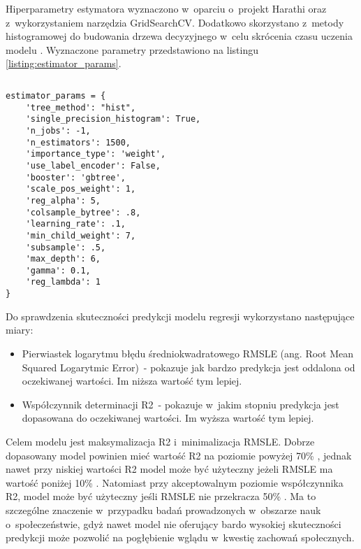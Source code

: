 Hiperparametry estymatora wyznaczono w~oparciu o~projekt Harathi \cite{harathi-2018} oraz z~wykorzystaniem narzędzia GridSearchCV.
Dodatkowo skorzystano z~metody histogramowej do budowania drzewa decyzyjnego w~celu skrócenia czasu uczenia modelu \cite{golarnyk-2021}.
Wyznaczone parametry przedstawiono na listingu \ref{listing:estimator_params}.


\noindent\begin{minipage}{\textwidth}
             \begin{lstlisting}[caption={Parametry estmatora}, label={listing:estimator_params}]
             \end{lstlisting}
             \hspace{.075\textwidth}\begin{minipage}{.85\textwidth}
                                        \begin{verbatim}
estimator_params = {
    'tree_method': "hist",
    'single_precision_histogram': True,
    'n_jobs': -1,
    'n_estimators': 1500,
    'importance_type': 'weight',
    'use_label_encoder': False,
    'booster': 'gbtree',
    'scale_pos_weight': 1,
    'reg_alpha': 5,
    'colsample_bytree': .8,
    'learning_rate': .1,
    'min_child_weight': 7,
    'subsample': .5,
    'max_depth': 6,
    'gamma': 0.1,
    'reg_lambda': 1
}
        \end{verbatim}
     \end{minipage}

     \raggedright\source{\ownwork}
     \vspace{0.75cm}
\end{minipage}

Do sprawdzenia skuteczności predykcji modelu regresji wykorzystano następujące miary:
\begin{itemize}
    \item Pierwiastek logarytmu błędu średniokwadratowego RMSLE (ang. Root Mean Squared Logarytmic Error)~- pokazuje jak bardzo predykcja jest oddalona od oczekiwanej wartości. Im niższa wartość tym lepiej.
    \item Współczynnik determinacji R2~- pokazuje w~jakim stopniu predykcja jest dopasowana do oczekiwanej wartości. Im wyższa wartość tym lepiej.
    \end{itemize}

Celem modelu jest maksymalizacja R2 i~minimalizacja RMSLE. Dobrze dopasowany model powinien mieć wartość R2 na poziomie powyżej 70\% \cite{r2-good-value}, jednak nawet przy niskiej wartości R2 model może być użyteczny jeżeli RMSLE ma wartość poniżej 10\% \cite{r2-vs-rmse}.
Natomiast przy akceptowalnym poziomie współczynnika R2, model może być użyteczny jeśli RMSLE nie przekracza 50\% \cite{rmse-good-value}.
Ma to szczególne znaczenie w~przypadku badań prowadzonych w~obszarze nauk o~społeczeństwie, gdyż nawet model nie oferujący bardo wysokiej skuteczności predykcji może pozwolić na pogłębienie wglądu w~kwestię zachowań społecznych.


